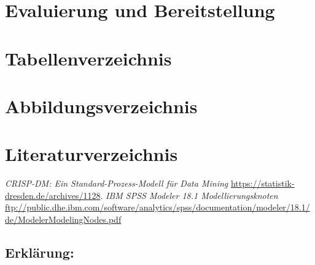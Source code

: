 \documentclass[a4paper,12pt]{article}
\begin{document}
\section{Evaluierung und Bereitstellung}

\newpage
\section{Tabellenverzeichnis}
\listoftables 


\newpage
\section{Abbildungsverzeichnis}
\listoffigures
{}
\newpage

\newpage
\section{Literaturverzeichnis}
\thispagestyle{plain}
\begin{thebibliography}{DiplRS}
 {\it CRISP-DM: Ein Standard-Prozess-Modell für Data Mining} \url{ https://statistik-dresden.de/archives/1128}.
 {\it IBM SPSS Modeler 18.1 Modellierungsknoten} 
\url{ftp://public.dhe.ibm.com/software/analytics/spss/documentation/modeler/18.1/de/ModelerModelingNodes.pdf}
\end{thebibliography}

\newpage
\begin{titlepage}
\section*{Erklärung:}

\vfill
\end{titlepage}
\end{document}
